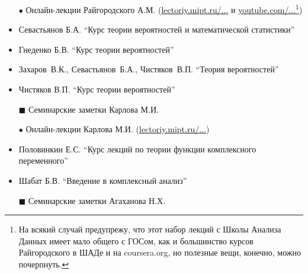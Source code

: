 \begin{itemize}[wide,  labelwidth=!, noitemsep, label=$\blacktriangleright$, labelindent = 0pt]
\item[$\bullet$]
Онлайн-лекции Райгородского А.М. (\href{http://lectoriy.mipt.ru/course/Maths-ProbabilityTheoryBasics-L15}{lectoriy.mipt.ru/...} и \href{https://www.youtube.com/playlist?list=PLJOzdkh8T5kouOIbZDCqzB72hBn9T7gsJ}{youtube.com/...\footnote{На всякий случай предупрежу, что этот набор лекций с Школы Анализа Данных имеет мало общего с ГОСом, как и большинство курсов Райгородского в ШАДе и на \href{https://www.coursera.org}{coursera.org}, но полезные вещи, конечно, можно почерпнуть.}})
\item
Севастьянов Б.А. ``Курс теории вероятностей и математической статистики''
\item
Гнеденко Б.В. ``Курс теории вероятностей''
\item 
Захаров~В.К., Севастьянов~Б.А., Чистяков~В.П. ``Теория вероятностей''
\item
Чистяков В.П. ``Курс теории вероятностей''
\item[$\blacksquare$]
Семинарские заметки Карлова М.И.
\end{itemize}

\begin{itemize}[wide,  labelwidth=!, noitemsep, label=$\blacktriangleright$, labelindent = 0pt]
\item[$\bullet$]
Онлайн-лекции Карлова М.И. (\href{http://lectoriy.mipt.ru/course/Maths-ComplexAnalysis-13L}{lectoriy.mipt.ru/...})
\item
Половинкин Е.С. ``Курс лекций по теории функции комплексного переменного''
\item
Шабат Б.В. ``Введение в комплексный анализ''
\item[$\blacksquare$]
Семинарские заметки Агаханова Н.Х.
\end{itemize}
